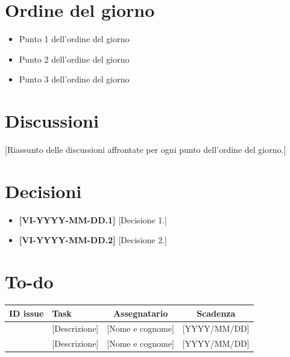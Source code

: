 \documentclass[11pt, a4paper]{article}
\begin{document}
\section{Ordine del giorno}
\begin{itemize}
    \item Punto 1 dell'ordine del giorno
    \item Punto 2 dell'ordine del giorno
    \item Punto 3 dell'ordine del giorno
\end{itemize}

\section{Discussioni}
[Riassunto delle discussioni affrontate per ogni punto dell'ordine del giorno.]

\section{Decisioni}
\begin{itemize}
    \item \textbf{[VI-YYYY-MM-DD.1]} [Decisione 1.]
    \item \textbf{[VI-YYYY-MM-DD.2]} [Decisione 2.]
\end{itemize}

\section{To-do}
\begin{table}[h]
    \centering
    \renewcommand{\arraystretch}{1.5}
    \begin{tabularx}{\textwidth}{|c|X|c|c|}
        \hline
        \rowcolor{gray!10} 
        \textbf{ID issue} & 
        \textbf{Task} & 
        \textbf{Assegnatario} & 
        \textbf{Scadenza} \\
        \hline
        [- o \#numero] & [Descrizione] & [Nome e cognome] & [YYYY/MM/DD] \\
        \hline
        [- o \#numero] & [Descrizione] & [Nome e cognome] & [YYYY/MM/DD] \\
        \hline
    \end{tabularx}
\end{table}
\end{document}
